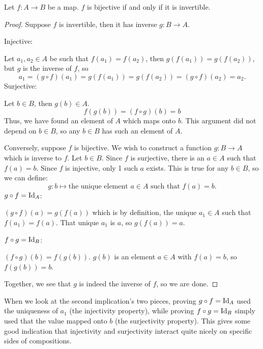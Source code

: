 \begin{theorem}\label{bijective_invertible}
    Let $f \colon A \to B$ be a map. $f$ is bijective if and only if it is invertible.
\end{theorem}
\begin{proof}
    Suppose $f$ is invertible, then it has inverse $g \colon B \to A$.

    \medskip\noindent
    Injective:

    \noindent
    Let $a_1, a_2 \in A$ be such that $f(a_1) = f(a_2)$, then $g(f(a_1)) = g(f(a_2))$, but $g$ is the inverse of $f$, so
    \begin{equation*}
        a_1 = (g\circ f)(a_1) = g(f(a_1)) = g(f(a_2)) = (g\circ f)(a_2) = a_2.
    \end{equation*}
    Surjective:

    \noindent
    Let $b \in B$, then $g(b) \in A$.
    \begin{equation*}
        f(g(b)) = (f \circ g)(b) = b
    \end{equation*}
    Thus, we have found an element of $A$ which maps onto $b$. This argument did not depend on $b \in B$, so any $b \in B$ has such an element of $A$.

    \medskip\noindent
    Conversely, suppose $f$ is bijective. We wish to construct a function $g \colon B \to A$ which is inverse to $f$.
    Let $b \in B$. Since $f$ is surjective, there is an $a \in A$ such that $f(a) = b$. Since $f$ is injective, only 1 such $a$ exists. This is true for any $b\in B$, so we can define:
    \begin{equation*}
        g \colon b \longmapsto \text{the unique element $a\in A$ such that $f(a) = b$}.
    \end{equation*}
    $g \circ f = \operatorname{Id}_A$:

    \noindent
    $(g \circ f)(a) = g(f(a))$ which is by definition, the unique $a_1 \in A$ such that $f(a_1) = f(a)$. That unique $a_1$ is $a$, so $g(f(a)) = a$.

    \medskip\noindent
    $f \circ g = \operatorname{Id}_B$:

    \noindent
    $(f \circ g)(b) = f(g(b))$. $g(b)$ is an element $a\in A$ with $f(a) = b$, so $f(g(b)) = b$.

    \medskip\noindent
    Together, we see that $g$ is indeed the inverse of $f$, so we are done.
\end{proof}
\begin{remark}
    When we look at the second implication's two pieces, proving $g \circ f = \operatorname{Id}_A$ used the uniqueness of $a_1$ (the injectivity property), while proving $f \circ g = \operatorname{Id}_B$ simply used that the value mapped onto $b$ (the surjectivity property).
    This gives some good indication that injectivity and surjectivity interact quite nicely on specific sides of compositions.
\end{remark}
